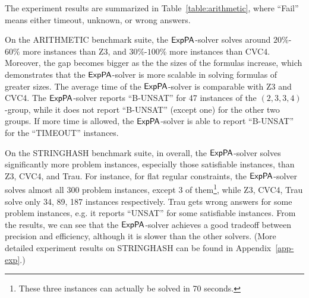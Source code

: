 The experiment results are summarized in Table~\ref{table:arithmetic}, where ``Fail'' means either timeout, unknown, or wrong answers. 

On the ARITHMETIC benchmark suite, the ${\sf ExpPA}$-solver solves around $20\%$-$60\%$ more instances than Z3, and $30\%$-$100\%$ more instances than CVC4. Moreover, the gap becomes bigger as the the sizes of the formulas increase, which demonstrates that the ${\sf ExpPA}$-solver is more scalable in solving formulas of greater sizes. The average time of the ${\sf ExpPA}$-solver is comparable with Z3 and CVC4. The ${\sf ExpPA}$-solver reports ``B-UNSAT'' for 47 instances of the $(2, 3, 3, 4)$-group, while it does not report ``B-UNSAT'' (except one) for the other two groups. If more time is allowed, the ${\sf ExpPA}$-solver is able to report ``B-UNSAT'' for the ``TIMEOUT'' instances. 



On the STRINGHASH benchmark suite, in overall, the ${\sf ExpPA}$-solver solves significantly more problem instances, especially those satisfiable instances, than Z3, CVC4, and Trau. For instance, for flat regular constraints, the ${\sf ExpPA}$-solver solves almost all 300 problem instances, except 3 of them\footnote{These three instances can actually be solved in 70 seconds.}, while  Z3, CVC4, Trau solve only 34, 89, 187 instances respectively.  Trau gets wrong answers for some problem instances, e.g. it reports ``UNSAT'' for some satisfiable instances. 
From the results, we can see that the ${\sf ExpPA}$-solver achieves a good tradeoff between precision and efficiency, although it is slower than the other solvers. (More detailed experiment results on STRINGHASH can be found in Appendix~\ref{app-exp}.)


%



